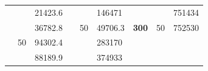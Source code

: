 \begin{table}[]
\begin{tabular}{|cclccllll}
\multicolumn{1}{|c|}{\cellcolor[HTML]{FFFFC7}}                                & \multicolumn{1}{c|}{\cellcolor[HTML]{DDFDFF}}                      & \multicolumn{1}{l|}{\cellcolor[HTML]{DDFDFF}21423.6}   & \multicolumn{1}{c|}{\cellcolor[HTML]{FFFFC7}}                                & \multicolumn{1}{c|}{\cellcolor[HTML]{DDFDFF}}                       & \multicolumn{1}{l|}{\cellcolor[HTML]{DAE8FC}146471}    & \multicolumn{1}{c|}{\cellcolor[HTML]{FFFFC7}}                                & \multicolumn{1}{c|}{\cellcolor[HTML]{DDFDFF}}                      & \multicolumn{1}{l|}{\cellcolor[HTML]{DAE8FC}751434}    \\ \cline{3-3} \cline{6-6} \cline{9-9} 
\rowcolor[HTML]{DDFDFF} 
\multicolumn{1}{|c|}{\cellcolor[HTML]{FFFFC7}}                                & \multicolumn{1}{c|}{\cellcolor[HTML]{DDFDFF}}                      & \multicolumn{1}{l|}{\cellcolor[HTML]{DAE8FC}36782.8}   & \multicolumn{1}{c|}{\cellcolor[HTML]{FFFFC7}}                                & \multicolumn{1}{c|}{\multirow{-10}{*}{\cellcolor[HTML]{DDFDFF}50}}  & \multicolumn{1}{l|}{\cellcolor[HTML]{DDFDFF}49706.3}   & \multicolumn{1}{c|}{\multirow{-19}{*}{\cellcolor[HTML]{FFFFC7}\textbf{300}}} & \multicolumn{1}{c|}{\multirow{-10}{*}{\cellcolor[HTML]{DDFDFF}50}} & \multicolumn{1}{l|}{\cellcolor[HTML]{DDFDFF}752530}    \\ \cline{3-3} \cline{5-9} 
\multicolumn{1}{|c|}{\cellcolor[HTML]{FFFFC7}}                                & \multicolumn{1}{c|}{\multirow{-10}{*}{\cellcolor[HTML]{DDFDFF}50}} & \multicolumn{1}{l|}{\cellcolor[HTML]{DDFDFF}94302.4}   & \multicolumn{1}{c|}{\cellcolor[HTML]{FFFFC7}}                                & \multicolumn{1}{c|}{\cellcolor[HTML]{DAE8FC}}                       & \multicolumn{1}{l|}{\cellcolor[HTML]{DAE8FC}283170}    &                                                                              &                                                                    &                                                        \\ \cline{2-3} \cline{6-6}
\multicolumn{1}{|c|}{\cellcolor[HTML]{FFFFC7}}                                & \multicolumn{1}{c|}{\cellcolor[HTML]{DAE8FC}}                      & \multicolumn{1}{l|}{\cellcolor[HTML]{DAE8FC}88189.9}   & \multicolumn{1}{c|}{\cellcolor[HTML]{FFFFC7}}                                & \multicolumn{1}{c|}{\cellcolor[HTML]{DAE8FC}}                       & \multicolumn{1}{l|}{\cellcolor[HTML]{DDFDFF}374933}    &                                                                              &                                                                    &                                                        \\ \cline{3-3} \cline{6-6}

\end{tabular}
\end{table}
